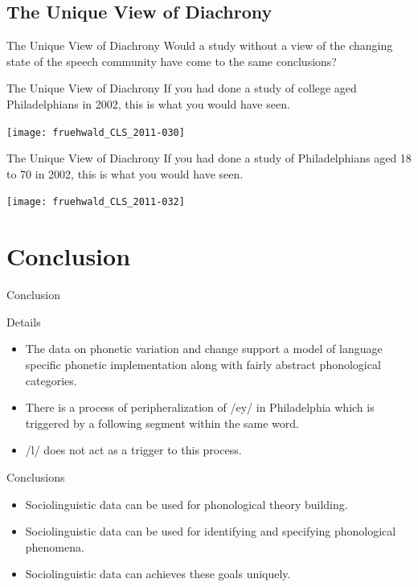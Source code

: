 \documentclass[]{beamer}
\begin{document}
\subsection{The Unique View of Diachrony}



\begin{frame}{The Unique View of Diachrony}
	Would a study without a view of the changing state of the speech community have come
	to the same conclusions?

\end{frame}

\begin{frame}{The Unique View of Diachrony}
	If you had done a study of college aged Philadelphians in 2002, this is what you would have seen.
	
\texttt{[image: fruehwald\_CLS\_2011-030]}
\end{frame}


\begin{frame}{The Unique View of Diachrony}
If you had done a study of Philadelphians aged 18 to 70 in 2002, this is what you would have seen.
	
\texttt{[image: fruehwald\_CLS\_2011-032]}
\end{frame}



\section{Conclusion}

\begin{frame}{Conclusion}
	
	\begin{block}{Details}
			\begin{itemize}
				\item The data on phonetic variation and change support a model of language specific phonetic implementation
					along with fairly abstract phonological categories.
				\item There is a process of peripheralization of /ey/ in Philadelphia which is triggered by a following segment within the same word.
				\item /l/ does not act as a trigger to this process.
			\end{itemize}
	\end{block}
\end{frame}


\begin{frame}{Conclusions}

	\begin{itemize}
		\item Sociolinguistic data can be used for phonological theory building.
		\item Sociolinguistic data can be used for identifying and specifying phonological phenomena.
		\item Sociolinguistic data can achieves these goals uniquely.
	\end{itemize}
\end{frame}
\end{document}
